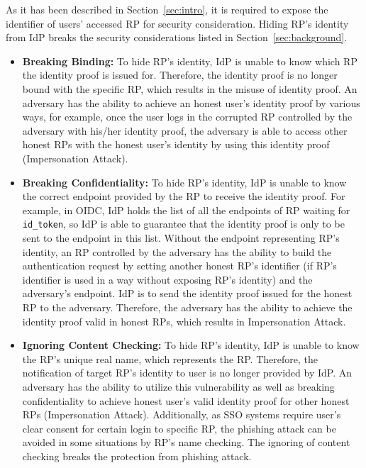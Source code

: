 As it has been described in Section~\ref{sec:intro}, it is required to expose the identifier of users' accessed RP for security consideration. Hiding RP's identity from IdP breaks the security considerations listed in Section~\ref{sec:background}.
\begin{itemize}
\item \textbf{Breaking Binding: }To hide RP's identity, IdP is unable to know which RP the identity proof is issued for. Therefore, the identity proof is no longer bound with the specific RP, which results in the misuse of identity proof. An adversary has the ability to achieve an honest user's identity proof by various ways, for example, once the user logs in the corrupted RP controlled by the adversary with his/her identity proof, the adversary is able to access other honest RPs with the honest user's identity by using this identity proof (Impersonation Attack).
\item \textbf{Breaking Confidentiality: }To hide RP's identity, IdP is unable to know the correct endpoint provided by the RP to receive the identity proof. For example, in OIDC, IdP holds the list of all the endpoints of RP waiting for \verb+id_token+, so IdP is able to guarantee that the identity proof is only to be sent to the endpoint in this list. Without the endpoint representing RP's identity, an RP controlled by the adversary has the ability to build the authentication request by setting another honest RP's identifier (if RP's identifier is used in a way without exposing RP's identity) and the adversary's endpoint. IdP is to send the identity proof issued for the honest RP to the adversary. Therefore, the adversary has the ability to achieve the identity proof valid in honest RPs, which results in Impersonation Attack.
\item \textbf{Ignoring Content Checking: }To hide RP's identity, IdP is unable to know the RP's unique real name, which represents the RP. Therefore, the notification of target RP's identity to user is no longer provided by IdP. An adversary has the ability to utilize this vulnerability as well as breaking confidentiality to achieve honest user's valid identity proof for other honest RPs (Impersonation Attack). Additionally, as SSO systems require user's clear consent for certain login to specific RP, the phishing attack can be avoided in some situations by RP's name checking. The ignoring of content checking breaks the protection from phishing attack.

\end{itemize}
